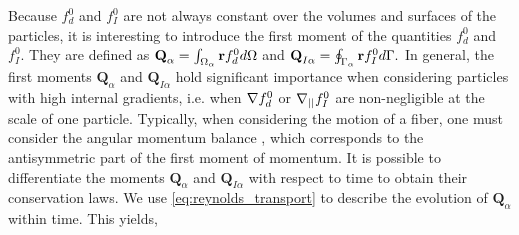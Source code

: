 Because $f_d^0$ and $f_I^0$ are not always constant over the volumes and surfaces of the particles, it is interesting to introduce the first moment of the quantities $f_d^0$ and $f_I^0$. 
They are defined as $\textbf{Q}_\alpha     = \int_{\Omega_{\alpha}}  \textbf{r} f_d^0  d\Omega$ and $\textbf{Q}_{I\alpha}    = \oint_{\Gamma_{\alpha}}  \textbf{r} f_I^0  d\Gamma.$ %
 In general, the first moments $\textbf{Q}_{\alpha}$ and $\textbf{Q}_{I\alpha}$ hold significant importance when considering particles with high internal gradients, i.e. when $\mathbf{\nabla} f_d^0$ or $\mathbf{\nabla}_{||} f_I^0$ are non-negligible at the scale of one particle. 
 Typically, when considering the motion of a fiber, one must consider the angular momentum balance \citep{guazzelli2011}, which corresponds to the antisymmetric part of the first moment of momentum.
  It is possible to differentiate the moments $\textbf{Q}_\alpha$ and $\textbf{Q}_{I\alpha}$  with respect to time to obtain their conservation laws.
We use \ref{eq:reynolds_transport} to describe the evolution of $\textbf{Q}_\alpha$ within time. This yields, 
